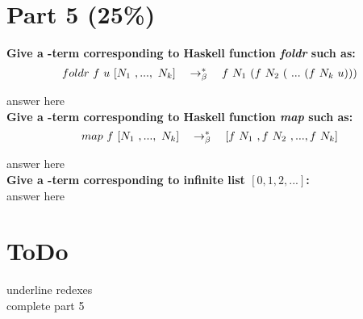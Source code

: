 \documentclass{article}
\begin{document}
	\section{Part 5 (25\%)}
	
	\begin{Large}
		\textbf{Give a \lamb -term corresponding to Haskell function \textit{foldr} such as:}\\
		
		\begin{equation*}
			foldr \ f \ u \ [N_1 \ ,..., \ N_k] \quad \rightarrow_\beta^*\quad f \ N_1\ (f \ N_2 \ ( \ ... \ (f \ N_k \ u)))
		\end{equation*}
		\newline
		
		answer here\\
		
		\textbf{Give a \lamb -term corresponding to Haskell function \textit{map} such as:}\\
		
		\begin{equation*}
			map \ f \ [N_1\ ,..., \ N_k] \equalsT [f \ N_1 \ , f \ N_2 \ ,...,f \ N_k]
		\end{equation*}
		\newline
		
		answer here\\
		
		\textbf{Give a \lamb -term corresponding to infinite list $[0,1,2,...]$:}\\
		
		answer here
	\end{Large}
	
	
	\newpage
	
	\section{ToDo}
	
	\begin{Large}
		underline redexes\\
		
		complete part 5\\
	\end{Large}
\end{document}
